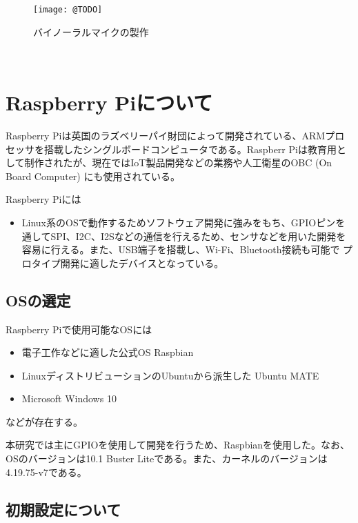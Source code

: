 \begin{figure}[H]
\centering
\texttt{[image: @TODO]}
\caption{バイノーラルマイクの製作}
\end{figure}

\
\section{Raspberry
Piについて}\label{about-raspberry}

Raspberry
Piは英国のラズベリーパイ財団によって開発されている、ARMプロセッサを搭載したシングルボードコンピュータである。Raspberr
Piは教育用として制作されたが、現在ではIoT製品開発などの業務や人工衛星のOBC
(On Board Computer) にも使用されている。

Raspberry Piには

\begin{itemize}
\tightlist
\item
  Linux系のOSで動作するためソフトウェア開発に強みをもち、GPIOピンを通してSPI、I2C、I2Sなどの通信を行えるため、センサなどを用いた開発を容易に行える。また、USB端子を搭載し、Wi-Fi、Bluetooth接続も可能で
  プロタイプ開発に適したデバイスとなっている。
\end{itemize}

\subsection{OSの選定}\label{choose-os}

Raspberry Piで使用可能なOSには

\begin{itemize}
\tightlist
\item
  電子工作などに適した公式OS Raspbian
\item
  LinuxディストリビューションのUbuntuから派生した Ubuntu MATE
\item
  Microsoft Windows 10
\end{itemize}

などが存在する。

本研究では主にGPIOを使用して開発を行うため、Raspbianを使用した。なお、OSのバージョンは10.1
Buster Liteである。また、カーネルのバージョンは4.19.75-v7である。

\subsection{初期設定について}\label{about-setup}

